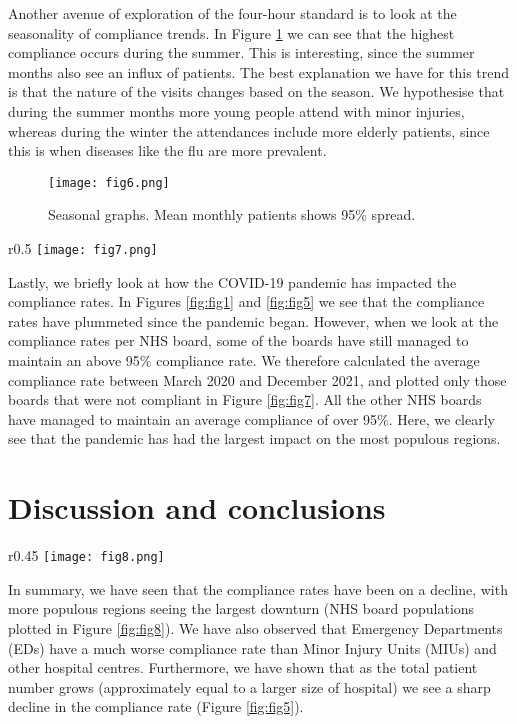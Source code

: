 \documentclass[12pt,a4paper]{article}
\begin{document}
Another avenue of exploration of the four-hour standard is to look at the seasonality of compliance trends. In Figure \ref{fig:fig6} we can see that the highest compliance occurs during the summer. This is interesting, since the summer months also see an influx of patients. The best explanation we have for this trend is that the nature of the visits changes based on the season. We hypothesise that during the summer months more young people attend with minor injuries, whereas during the winter the attendances include more elderly patients, since this is when diseases like the flu are more prevalent.
\begin{figure}[h]
    \centering
    \texttt{[image: fig6.png]}
    \caption{Seasonal graphs. Mean monthly patients shows 95\% spread.}
    \label{fig:fig6}
\end{figure}

\begin{wrapfigure}{r}{0.5\linewidth}
    \centering
    \texttt{[image: fig7.png]}
    \caption{Mean compliance rate for non-compliant NHS boards (compliance averaged between Mar 2020 and Dec 2021).}
    \label{fig:fig7}
\end{wrapfigure}
Lastly, we briefly look at how the COVID-19 pandemic has impacted the compliance rates. In Figures \ref{fig:fig1} and \ref{fig:fig5} we see that the compliance rates have plummeted since the pandemic began. 
However, when we look at the compliance rates per NHS board, some of the boards have still managed to maintain an above 95\% compliance rate. We therefore calculated the average compliance rate between March 2020 and December 2021, and plotted only those boards that were not compliant in Figure \ref{fig:fig7}. All the other NHS boards have managed to maintain an average compliance of over 95\%. Here, we clearly see that the pandemic has had the largest impact on the most populous regions.
    
\section{Discussion and conclusions}

\begin{wrapfigure}{r}{0.45\linewidth}
    \vspace{-6em}
    \centering
    \texttt{[image: fig8.png]}
    \caption{Population per NHS board (2021).}
    \label{fig:fig8}
    \vspace{-2em}
\end{wrapfigure}
In summary, we have seen that the compliance rates have been on a decline, with more populous regions seeing the largest downturn (NHS board populations plotted in Figure \ref{fig:fig8}). We have also observed that Emergency Departments (EDs) have a much worse compliance rate than Minor Injury Units (MIUs) and other hospital centres. Furthermore, we have shown that as the total patient number grows (approximately equal to a larger size of hospital) we see a sharp decline in the compliance rate (Figure \ref{fig:fig5}).
\end{document}

